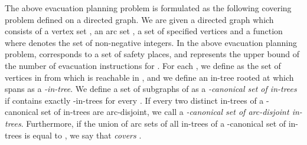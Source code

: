 \documentclass[11pt]{article}
\newcounter{ni}
\theoremstyle{plain}
\begin{document}
The above evacuation planning problem is formulated as the following
covering problem defined on a directed graph. 
We are given a directed graph  
which consists of a vertex set , an arc set , a set of  specified vertices
 and a function  where  denotes the set of non-negative integers. 
In the above evacuation planning problem,  corresponds to a set of safety
places, and  represents the upper bound of
the number of evacuation instructions for . 
For each , we define  as the
set of vertices in  from which  is reachable in , and we define an in-tree
rooted at  which spans  as a {\it -in-tree}.
We define a set  of  subgraphs of  
as a {\it -canonical set of in-trees}
if  contains exactly  -in-trees for every . 
If every two distinct in-trees of a -canonical set  
of in-trees are arc-disjoint, we call  a {\it 
-canonical set of arc-disjoint in-trees}. 
Furthermore, if the union of arc sets of all
in-trees of a -canonical set  of in-trees 
is equal to , we say that  {\it covers} . 
\end{document}
